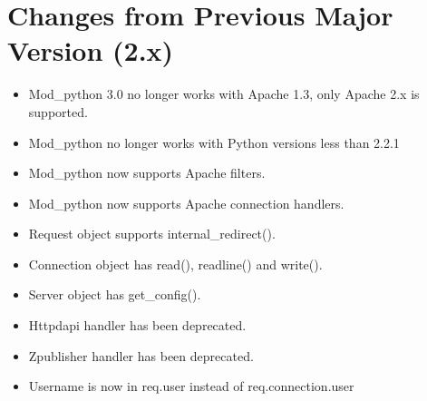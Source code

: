 \chapter{Changes from Previous Major Version (2.x)\label{app-changes}}


  \begin{itemize}

    \item
      Mod_python 3.0 no longer works with Apache 1.3, only Apache 2.x is
      supported.
    \item
      Mod_python no longer works with Python versions less than 2.2.1
    \item 
      Mod_python now supports Apache filters.
    \item 
      Mod_python now supports Apache connection handlers.
    \item 
      Request object supports internal_redirect().
    \item
      Connection object has read(), readline() and write().
    \item
      Server object has get_config().
    \item
       
      Httpdapi handler has been deprecated.
    \item
      Zpublisher handler has been deprecated.
    \item
      Username is now in req.user instead of req.connection.user
  \end{itemize}
